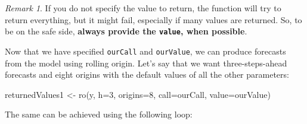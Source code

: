 \documentclass[
]{book}
\newenvironment{Shaded}{\begin{snugshade}}{\end{snugshade}}
\newcommand{\AttributeTok}[1]{\textcolor[rgb]{0.77,0.63,0.00}{#1}}
\newcommand{\DecValTok}[1]{\textcolor[rgb]{0.00,0.00,0.81}{#1}}
\newcommand{\FunctionTok}[1]{\textcolor[rgb]{0.00,0.00,0.00}{#1}}
\newcommand{\NormalTok}[1]{#1}
\newcommand{\OtherTok}[1]{\textcolor[rgb]{0.56,0.35,0.01}{#1}}
\theoremstyle{definition}
\theoremstyle{definition}
\theoremstyle{definition}
\theoremstyle{definition}
\theoremstyle{remark}
\newtheorem*{remark}{Remark}
\begin{document}
\begin{remark}
If you do not specify the value to return, the function will try to return everything, but it might fail, especially if many values are returned. So, to be on the safe side, \textbf{always provide the \texttt{value}, when possible}.
\end{remark}

Now that we have specified \texttt{ourCall} and \texttt{ourValue}, we can produce forecasts from the model using rolling origin. Let's say that we want three-steps-ahead forecasts and eight origins with the default values of all the other parameters:

\begin{Shaded}
\begin{Highlighting}[]
\NormalTok{returnedValues1 }\OtherTok{\textless{}{-}} \FunctionTok{ro}\NormalTok{(y, }\AttributeTok{h=}\DecValTok{3}\NormalTok{, }\AttributeTok{origins=}\DecValTok{8}\NormalTok{,}
                      \AttributeTok{call=}\NormalTok{ourCall, }\AttributeTok{value=}\NormalTok{ourValue)}
\end{Highlighting}
\end{Shaded}

The same can be achieved using the following loop:
\end{document}
